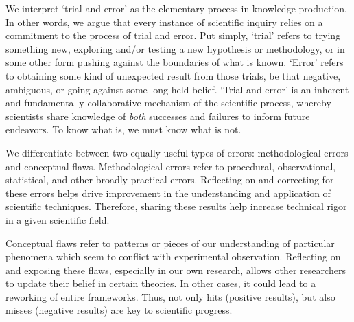 \documentclass[twocolumn, serif]{jote-article}
\begin{document}
{\hypertarget{what-is-trial-and-error}{%

We interpret `trial and error' as the elementary process in knowledge production. In other words, we argue that every instance of scientific inquiry relies on a commitment to the process of trial and error. Put simply, `trial' refers to trying something new, exploring and/or testing a new hypothesis or methodology, or in some other form pushing against the boundaries of what is known. `Error' refers to obtaining some kind of unexpected result from those trials, be that negative, ambiguous, or going against some long-held belief. `Trial and error' is an inherent and fundamentally collaborative mechanism of the scientific process, whereby scientists share knowledge of \emph{both} successes and failures to inform future endeavors. To know what is, we must know what is not.

\hypertarget{when-is-trial-and-error-productive}{%

We differentiate between two equally useful types of errors: methodological errors and conceptual flaws. Methodological errors refer to procedural, observational, statistical, and other broadly practical errors. Reflecting on and correcting for these errors helps drive improvement in the understanding and application of scientific techniques. Therefore, sharing these results help increase technical rigor in a given scientific field.

Conceptual flaws refer to patterns or pieces of our understanding of particular phenomena which seem to conflict with experimental observation. Reflecting on and exposing these flaws, especially in our own research, allows other researchers to update their belief in certain theories. In other cases, it could lead to a reworking of entire frameworks. Thus, not only hits (positive results), but also misses (negative results) are key to scientific progress.

\hypertarget{how-does-trial-and-error-relate-to-various-disciplines}{%

}}}}
\end{document}

